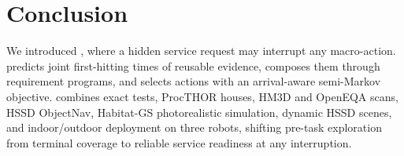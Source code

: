 \section{Conclusion}
\label{sec:conclusion}

We introduced \taskname{}, where a hidden service request may interrupt any macro-action.
\method{} predicts joint first-hitting times of reusable evidence, composes them through requirement programs, and selects actions with an arrival-aware semi-Markov objective.
\bench{} combines exact tests, ProcTHOR houses, HM3D and OpenEQA scans, HSSD ObjectNav, Habitat-GS photorealistic simulation, dynamic HSSD scenes, and indoor/outdoor deployment on three robots, shifting pre-task exploration from terminal coverage to reliable service readiness at any interruption.
